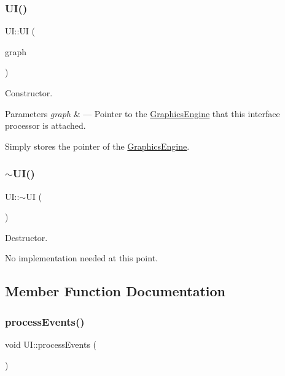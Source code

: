 \subsubsection{\texorpdfstring{U\+I()}{UI()}}
{\footnotesize\ttfamily U\+I\+::\+UI (\begin{DoxyParamCaption}\item[{\hyperlink{class_graphics_engine}{Graphics\+Engine} $\ast$}]{graph }\end{DoxyParamCaption})}



Constructor. 


\begin{DoxyParams}{Parameters}
{\em graph} & --- Pointer to the \hyperlink{class_graphics_engine}{Graphics\+Engine} that this interface processor is attached.\\
\hline
\end{DoxyParams}
Simply stores the pointer of the \hyperlink{class_graphics_engine}{Graphics\+Engine}. \mbox{\label{class_u_i_a1b23d0c64c7cbb3d143d90ec532a7ccd}} 
\subsubsection{\texorpdfstring{$\sim$\+U\+I()}{~UI()}}
{\footnotesize\ttfamily U\+I\+::$\sim$\+UI (\begin{DoxyParamCaption}{ }\end{DoxyParamCaption})}



Destructor. 

No implementation needed at this point. 

\subsection{Member Function Documentation}
\mbox{\label{class_u_i_a440e133dbf19d82b8b40809644494068}} 
\subsubsection{\texorpdfstring{process\+Events()}{processEvents()}}
{\footnotesize\ttfamily void U\+I\+::process\+Events (\begin{DoxyParamCaption}{ }\end{DoxyParamCaption})}



